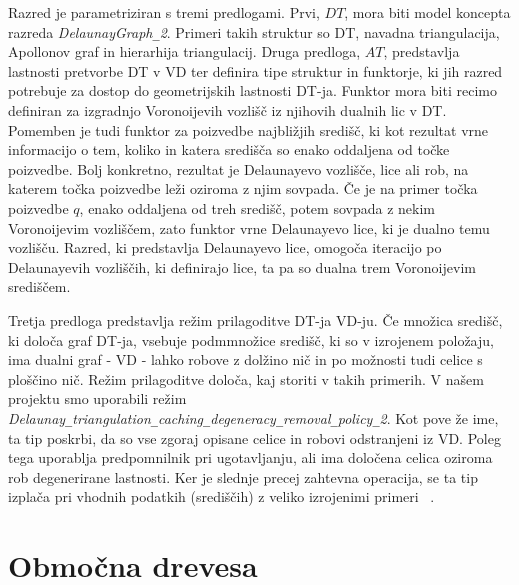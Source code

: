 \documentclass[a4paper, 12pt]{book}
\newcommand{\U}{\texttt{\_}}
\begin{document}
Razred je parametriziran s tremi predlogami. Prvi, $DT$, mora biti model koncepta razreda \textit{DelaunayGraph\U 2}. Primeri takih struktur so DT, navadna triangulacija, Apollonov graf in hierarhija triangulacij. Druga predloga, $AT$, predstavlja lastnosti pretvorbe DT v VD ter definira tipe struktur in funktorje, ki jih razred potrebuje za dostop do geometrijskih lastnosti DT-ja. Funktor mora biti recimo definiran za izgradnjo Voronoijevih vozlišč iz njihovih dualnih lic v DT. Pomemben je tudi funktor za poizvedbe najbližjih središč, ki kot rezultat vrne informacijo o tem, koliko in katera središča so enako oddaljena od točke poizvedbe. Bolj konkretno, rezultat je Delaunayevo vozlišče, lice ali rob, na katerem točka poizvedbe leži oziroma z njim sovpada. Če je na primer točka poizvedbe $q$, enako oddaljena od treh središč, potem sovpada z nekim Voronoijevim vozliščem, zato funktor vrne Delaunayevo lice, ki je dualno temu vozlišču. Razred, ki predstavlja Delaunayevo lice, omogoča iteracijo po Delaunayevih vozliščih, ki definirajo lice, ta pa so dualna trem Voronoijevim središčem.

Tretja predloga predstavlja režim prilagoditve DT-ja VD-ju. 
Če množica središč, ki določa graf DT-ja, vsebuje podmmnožice središč, ki so v izrojenem položaju, ima dualni graf - VD - lahko robove z dolžino nič in po možnosti tudi celice s ploščino nič. Režim prilagoditve določa, kaj storiti v takih primerih. V našem projektu smo uporabili režim \\ \textit{Delaunay\U triangulation\U caching\U degeneracy\U removal\U policy\U 2}. Kot pove že ime, ta tip poskrbi, da so vse zgoraj opisane celice in robovi odstranjeni iz VD. Poleg tega uporablja predpomnilnik pri ugotavljanju, ali ima določena celica oziroma rob degenerirane lastnosti. Ker je slednje precej zahtevna operacija, se ta tip izplača pri vhodnih podatkih (središčih) z veliko izrojenimi primeri ~\cite{cgal:k-vda2-15a}.
 
\section{Območna drevesa}
\end{document}
